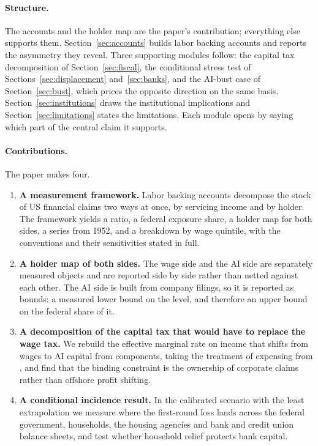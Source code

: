 \paragraph{Structure.} The accounts and the holder map are the paper's contribution; everything
else supports them. Section~\ref{sec:accounts} builds labor backing accounts and reports the
asymmetry they reveal. Three supporting modules follow: the capital tax decomposition of
Section~\ref{sec:fiscal}, the conditional stress test of Sections~\ref{sec:displacement}
and~\ref{sec:banks}, and the AI-bust case of Section~\ref{sec:bust}, which prices the opposite
direction on the same basis. Section~\ref{sec:institutions} draws the institutional implications
and Section~\ref{sec:limitations} states the limitations. Each module opens by saying which part
of the central claim it supports.

\paragraph{Contributions.} The paper makes four.

\begin{enumerate}[leftmargin=1.4em,itemsep=0.2em]
\item \textbf{A measurement framework.} Labor backing accounts decompose the stock of US financial
claims two ways at once, by servicing income and by holder. The framework yields a ratio, a
federal exposure share, a holder map for both sides, a series from 1952, and a breakdown by wage
quintile, with the conventions and their sensitivities stated in full.

\item \textbf{A holder map of both sides.} The wage side and the AI side are separately measured
objects and are reported side by side rather than netted against each other. The AI side is built
from company filings, so it is reported as bounds: a measured lower bound on the level, and
therefore an upper bound on the federal share of it.

\item \textbf{A decomposition of the capital tax that would have to replace the wage tax.} We
rebuild the effective marginal rate on income that shifts from wages to AI capital from
components, taking the treatment of expensing from \citet{AcemogluManeraRestrepo2020}, and find
that the binding constraint is the ownership of corporate claims rather than offshore profit
shifting.

\item \textbf{A conditional incidence result.} In the calibrated scenario with the least
extrapolation we measure where the first-round loss lands across the federal government, households, the housing
agencies and  bank and credit union balance sheets, and test whether
household relief protects bank capital.
\end{enumerate}

